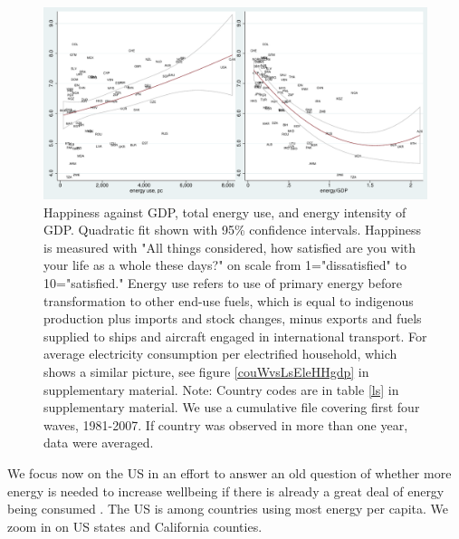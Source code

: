 \documentclass[10pt, letterpaper]{article}
\begin{document}
\begin{spacing}{1.4}
\begin{figure}[H]
 \includegraphics[width=6in]{graphsAndTables/couWvsLsEnePerGdp2.pdf}\centering \caption{Happiness
   against GDP, total energy use, and energy intensity of GDP. Quadratic fit
   shown with 95\% confidence intervals. Happiness is measured with "All things considered, how satisfied are you with your life as a whole these days?" on scale from 1="dissatisfied" to 10="satisfied." Energy use refers to use of primary energy before transformation to other end-use fuels, which is equal to indigenous production plus imports and stock changes, minus exports and fuels supplied to ships and aircraft engaged in international transport. For average electricity consumption per electrified household, which shows a similar picture, see figure \ref{couWvsLsEleHHgdp} in supplementary material.  Note: Country codes are in table \ref{ls} in supplementary material. We use a cumulative file covering first four waves, 1981-2007. If country was observed in more than one year, data were averaged.}\label{couWvsLsEnePerGdp2} %
\end{figure}


We  focus now on the US in an effort to answer
an old question of whether more energy is needed to increase wellbeing if there
is already a great deal of energy being consumed \cite{mazur74}. The US is among
countries using most energy per capita.
%
 We zoom in on US states and California counties.


\end{spacing}
\end{document}
